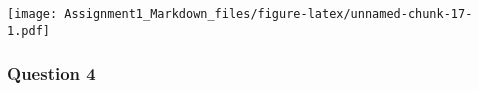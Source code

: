 \documentclass[
]{article}
\begin{document}
\texttt{[image: Assignment1\_Markdown\_files/figure-latex/unnamed-chunk-17-1.pdf]}

\newpage

\hypertarget{question-4}{%
\subsubsection{Question 4}\label{question-4}}
\end{document}
